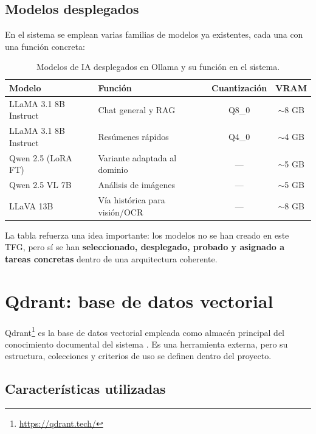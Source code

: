 \subsection{Modelos desplegados}

En el sistema se emplean varias familias de modelos ya existentes, cada una con una función concreta:

\begin{table}[H]
\centering
\caption{Modelos de IA desplegados en Ollama y su función en el sistema.}
\label{tab:modelos-ollama}
\begin{tabular}{llcc}
\toprule
\textbf{Modelo} & \textbf{Función} & \textbf{Cuantización} & \textbf{VRAM} \\
\midrule
LLaMA 3.1 8B Instruct & Chat general y RAG & Q8\_0 & $\sim$8 GB \\
LLaMA 3.1 8B Instruct & Resúmenes rápidos & Q4\_0 & $\sim$4 GB \\
Qwen 2.5 (LoRA FT)    & Variante adaptada al dominio & --- & $\sim$5 GB \\
Qwen 2.5 VL 7B        & Análisis de imágenes & --- & $\sim$5 GB \\
LLaVA 13B             & Vía histórica para visión/OCR & --- & $\sim$8 GB \\
\bottomrule
\end{tabular}
\end{table}

La tabla refuerza una idea importante: los modelos no se han creado en este TFG, pero sí se han \textbf{seleccionado, desplegado, probado y asignado a tareas concretas} dentro de una arquitectura coherente.

\section{Qdrant: base de datos vectorial}
\label{sec:qdrant}

Qdrant\footnote{\url{https://qdrant.tech/}} es la base de datos vectorial empleada como almacén principal del conocimiento documental del sistema \cite{qdrant2024docs}. Es una herramienta externa, pero su estructura, colecciones y criterios de uso se definen dentro del proyecto.

\subsection{Características utilizadas}

